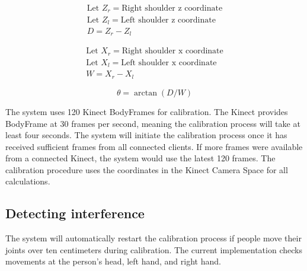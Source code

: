 \begin{equation}
\label{eq:theta_d}
\begin{gathered}
\text{Let } Z_r = \text{Right shoulder z coordinate} \\
\text{Let } Z_l = \text{Left shoulder z coordinate} \\
D = Z_r - Z_l
\end{gathered}
\end{equation}

\begin{equation}
\label{eq:theta_w}
\begin{gathered}
\text{Let } X_r = \text{Right shoulder x coordinate} \\
\text{Let } X_l = \text{Left shoulder x coordinate} \\
W = X_r - X_l
\end{gathered}
\end{equation}

\begin{equation}
\label{eq:theta}
\theta = \arctan(D/W)
\end{equation}

The system uses 120 Kinect BodyFrames for calibration. The Kinect provides BodyFrame at 30 frames per second, meaning the calibration process will take at least four seconds. The system will initiate the calibration process once it has received sufficient frames from all connected clients. If more frames were available from a connected Kinect, the system would use the latest 120 frames. The calibration procedure uses the coordinates in the Kinect Camera Space for all calculations.

\subsection{Detecting interference}

The system will automatically restart the calibration process if people move their joints over ten centimeters during calibration. The current implementation checks movements at the person's head, left hand, and right hand.



